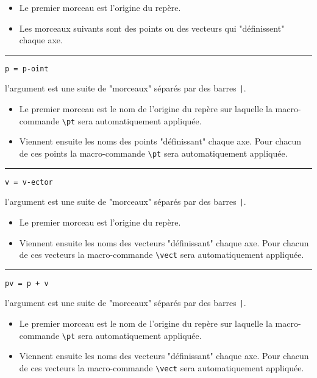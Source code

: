 \documentclass[12pt,a4paper]{article}
\theoremstyle{definition}
\newcommand\env[1]{\texttt{#1}}
\newcommand\macro[1]{\env{\textbackslash{}#1}}
\newcommand\separation{
    \medskip
    \hfill\rule{0.5\textwidth}{0.75pt}\hfill
    \medskip
}
\newcommand\mwhyprefix[2]{%
    \texttt{#1 = #1-#2}%
}
\newcommand\prefix[1]{%
    \texttt{#1}%
}
\begin{document}
\begin{itemize}[topsep=0pt]
	\item Le premier morceau est l'origine du repère.

	\item Les morceaux suivants sont des points ou des vecteurs qui "définissent" chaque axe.
\end{itemize}


\separation

 \hfill \mwhyprefix{p}{oint}

\IDarg{} l'argument est une suite de "morceaux" séparés par des barres \verb+|+.

\begin{itemize}[topsep=0pt]
	\item Le premier morceau est le nom de l'origine du repère sur laquelle la macro-commande \macro{pt} sera automatiquement appliquée.

	\item Viennent ensuite les noms des points "définissant" chaque axe. Pour chacun de ces points la macro-commande \macro{pt} sera automatiquement appliquée.
\end{itemize}


\separation

 \hfill \mwhyprefix{v}{ector}

\IDarg{} l'argument est une suite de "morceaux" séparés par des barres \verb+|+.

\begin{itemize}[topsep=0pt]
	\item Le premier morceau est l'origine du repère.

	\item Viennent ensuite les noms des vecteurs "définissant" chaque axe. Pour chacun de ces vecteurs la macro-commande \macro{vect} sera automatiquement appliquée.
\end{itemize}


\separation

 \hfill \prefix{pv = p + v}

\IDarg{} l'argument est une suite de "morceaux" séparés par des barres \verb+|+.

\begin{itemize}[topsep=0pt]
	\item Le premier morceau est le nom de l'origine du repère sur laquelle la macro-commande \macro{pt} sera automatiquement appliquée.

	\item Viennent ensuite les noms des vecteurs "définissant" chaque axe. Pour chacun de ces vecteurs la macro-commande \macro{vect} sera automatiquement appliquée.
\end{itemize}
\end{document}
